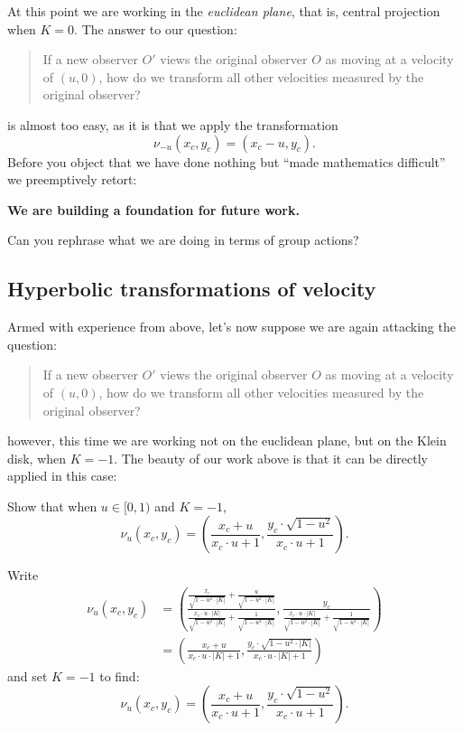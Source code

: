 \documentclass[12pt,noauthor,nooutcomes,handout,hints,newpage]{ximera}
\begin{document}
At this point we are working in the \textit{euclidean plane}, that is,
central projection when $K=0$.
The answer to our question:
\begin{quote}
  If a new observer $O'$ views the original observer $O$ as moving at
  a velocity of $(u,0)$, how do we transform all other velocities
  measured by the original observer?
\end{quote}
is almost too easy, as it is that we apply the transformation
\[
\nu_{-u}(x_c,y_c) = (x_c-u,y_c).
\]
Before you object that we have done nothing but ``made mathematics
difficult'' we preemptively retort:
\begin{center}
  \textbf{We are building a foundation for future work.}
\end{center}

\begin{problem}
  Can you rephrase what we are doing in terms of group actions?
\end{problem}




\subsection{Hyperbolic transformations of velocity}

Armed with experience from above, let's now suppose we are again attacking the question:
\begin{quote}
  If a new observer $O'$ views the original observer $O$ as moving at
  a velocity of $(u,0)$, how do we transform all other velocities
  measured by the original observer?
\end{quote}
however, this time we are working not on the euclidean plane, but on
the Klein disk, when $K=-1$. The beauty of our work above is that it
can be directly applied in this case:

\begin{problem}
  Show that when $u\in [0,1)$ and $K=-1$,
  \[
  \nu_u(x_c,y_c) = \left(\frac{x_c + u}{x_c\cdot u + 1},\frac{y_c\cdot \sqrt{1-u^2}}{x_c\cdot u+1}\right).
  \]
  \begin{freeResponse}
    Write
    \begin{align*}
    \nu_u(x_c,y_c)&=\left(\frac{\frac{x_c}{\sqrt{1-u^2\cdot|K|}} + \frac{u}{\sqrt{1-u^2\cdot|K|}}}
         {\frac{x_c\cdot u \cdot |K|}{\sqrt{1-u^2\cdot|K|}}+\frac{1}{\sqrt{1-u^2\cdot |K|}}},
         \frac{y_c}{\frac{x_c\cdot u \cdot |K|}{\sqrt{1-u^2\cdot|K|}}+\frac{1}{\sqrt{1-u^2\cdot |K|}}}\right)\\
         &=\left(\frac{x_c + u}{x_c\cdot u \cdot |K|+1},\frac{y_c\cdot \sqrt{1-u^2\cdot|K|}}{x_c\cdot u \cdot |K|+1}\right)
    \end{align*}
    and set $K=-1$ to find:
    \[
    \nu_u(x_c,y_c)=\left(\frac{x_c + u}{x_c\cdot u + 1},\frac{y_c\cdot \sqrt{1-u^2}}{x_c\cdot u+1}\right).
    \]
  \end{freeResponse}
\end{problem}
\end{document}
